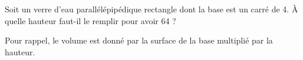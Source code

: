 
\begin{exercice}\label{exoSeconde-0064}

    Soit un verre d'eau parallélépipédique rectangle dont la base est un carré de \unit{4}{\centi\meter}. À quelle hauteur faut-il le remplir pour avoir \unit{64}{\centi\meter\cubed} ?

    Pour rappel, le volume est donné par la surface de la base multiplié par la hauteur.

\end{exercice}
